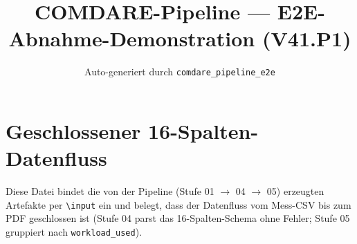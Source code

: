 \documentclass[11pt,a4paper]{article}
\title{COMDARE-Pipeline --- E2E-Abnahme-Demonstration (V41.P1)}
\author{Auto-generiert durch \texttt{comdare\_pipeline\_e2e}}
\date{}
\begin{document}
\maketitle

\section*{Geschlossener 16-Spalten-Datenfluss}
Diese Datei bindet die von der Pipeline (Stufe 01 $\to$ 04 $\to$ 05) erzeugten Artefakte
per \texttt{\textbackslash input} ein und belegt, dass der Datenfluss vom Mess-CSV bis zum
PDF geschlossen ist (Stufe 04 parst das 16-Spalten-Schema ohne Fehler; Stufe 05 gruppiert
nach \texttt{workload\_used}).

\bigskip


\bigskip

\end{document}
